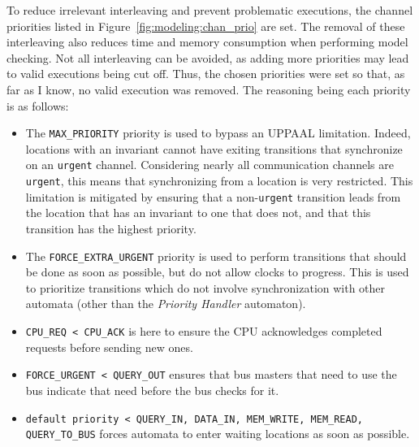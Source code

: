 To reduce irrelevant interleaving and prevent problematic executions,
the channel priorities listed in Figure~\ref{fig:modeling:chan_prio} are set.
The removal of these interleaving also reduces time and memory consumption when
performing model checking. Not all interleaving can be avoided, as adding more
priorities may lead to valid executions being cut off. Thus, the chosen
priorities were set so that, as far as I know, no valid execution was removed.
The reasoning being each priority is as follows:
\begin{itemize}
\item
   The \lstinline!MAX_PRIORITY! priority is used to bypass an UPPAAL limitation.
   Indeed, locations with an invariant cannot have exiting transitions that
   synchronize on an \texttt{urgent} channel. Considering nearly all communication
   channels are \texttt{urgent}, this means that synchronizing from a location
   is very restricted. This limitation is mitigated by ensuring that a
   non-\texttt{urgent} transition leads from the location that has an invariant
   to one that does not, and that this transition has the highest priority.
\item
   The \lstinline!FORCE_EXTRA_URGENT! priority is used to perform transitions
   that should be done as soon as possible, but do not allow clocks to
   progress. This is used to prioritize transitions which do not involve
   synchronization with other automata (other than the \textit{Priority
   Handler} automaton).
\item
   \lstinline!CPU_REQ < CPU_ACK! is here to ensure the CPU acknowledges
   completed requests before sending new ones.
\item
   \lstinline!FORCE_URGENT < QUERY_OUT! ensures that bus masters that need to
   use the bus indicate that need before the bus checks for it.
\item
   \lstinline!default priority < QUERY_IN, DATA_IN, MEM_WRITE, MEM_READ, QUERY_TO_BUS!
   forces automata to enter waiting locations as soon as possible.
\end{itemize}


